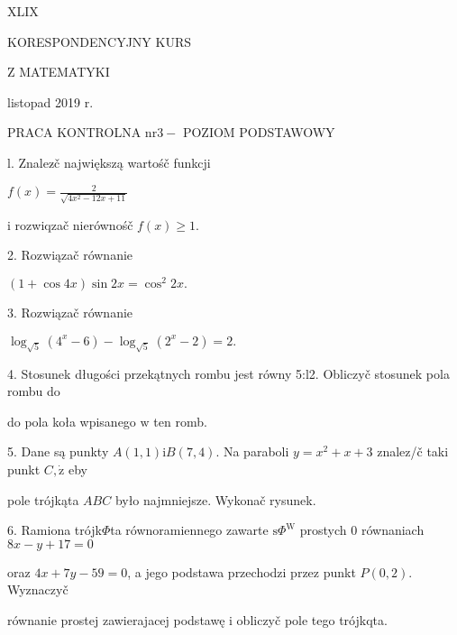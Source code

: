 \documentclass[a4paper,12pt]{article}
\begin{document}
XLIX

KORESPONDENCYJNY KURS

Z MATEMATYKI

listopad 2019 r.

PRACA KONTROLNA $\mathrm{n}\mathrm{r} 3-$ POZIOM PODSTAWOWY

l. Znalez$\acute{}$č największą wartośč funkcji

$f(x)=\displaystyle \frac{2}{\sqrt{4x^{2}-12x+11}}$

$\mathrm{i}$ rozwiqzač nierównośč $f(x)\geq 1.$

2. Rozwiązač równanie

$(1+\cos 4x)\sin 2x=\cos^{2}2x.$

3. Rozwiązač równanie

$\log_{\sqrt{5}}(4^{x}-6)-\log_{\sqrt{5}}(2^{x}-2)=2.$

4. Stosunek długości przekątnych rombu jest równy 5:l2. Obliczyč stosunek pola rombu do

do pola koła wpisanego $\mathrm{w}$ ten romb.

5. Dane są punkty $A(1,1)\mathrm{i}B(7,4)$. Na paraboli $y=x^{2}+x+3$ znalez/č taki punkt $C, \dot{\mathrm{z}}$ eby

pole trójkąta $ABC$ było najmniejsze. Wykonač rysunek.

6. Ramiona trójk$\Phi$ta równoramiennego zawarte $\mathrm{s}\Phi^{\mathrm{W}}$ prostych $0$ równaniach $8x-y+17=0$

oraz $4x+7y-59 = 0$, a jego podstawa przechodzi przez punkt $P(0,2)$. Wyznaczyč

równanie prostej zawierajacej podstawę $\mathrm{i}$ obliczyč pole tego trójkqta.
\end{document}
